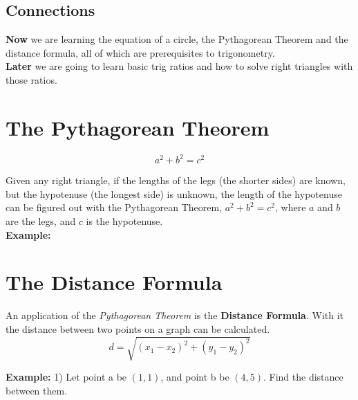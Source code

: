 \documentclass[12pt]{article}
\begin{document}
\subsection*{Connections}

\textbf{Now} we are learning the equation of a circle, the Pythagorean Theorem and the distance formula, all of which are prerequisites to trigonometry.\\

\textbf{Later} we are going to learn basic trig ratios and how to solve right triangles with those ratios.\\

\let\stdsection\section
\renewcommand\section{\newpage\stdsection}

\section*{The Pythagorean Theorem}

$$a^2+b^2=c^2$$

Given any right triangle, if the lengths of the legs (the shorter sides) are known, but the hypotenuse (the longest side) is unknown, the length of the hypotenuse can be figured out with the Pythagorean Theorem, $a^2+b^2=c^2$, where $a$ and $b$ are the legs, and $c$ is the hypotenuse.\\

\textbf{Example:} 

\pagebreak

\section*{The Distance Formula}

An application of the \textit{Pythagorean Theorem} is the \textbf{Distance Formula}. With it the distance between two points on a graph can be calculated.\\

$$d=\sqrt{(x_1-x_2)^{2}+(y_1-y_2)^{2}}$$

\textbf{Example:} 1) Let point a be $(1,1)$, and point b be $(4,5)$. Find the distance between them.\\

\begin{center}
\end{center}
\end{document}
